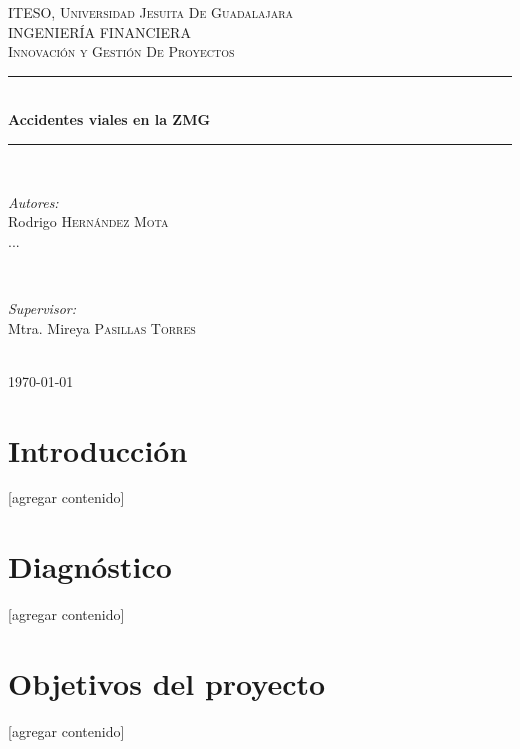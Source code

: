 \documentclass{article}
\begin{document}
\begin{titlepage}
\newcommand{\HRule}{\rule{\linewidth}{0.5mm}}

\center
\textsc{\LARGE ITESO, Universidad Jesuita De Guadalajara}\\[2cm]
\textsc{\Large INGENIERÍA FINANCIERA}\\[1cm]
\textsc{\large Innovación y Gestión De Proyectos}\\[1cm]
\HRule \\[2cm]
{ \huge \bfseries Accidentes viales en la ZMG}\\[2cm] 
\HRule \\[2cm]
\begin{minipage}{0.4\textwidth}
\begin{flushleft} \large


\emph{Autores:}\\
Rodrigo \textsc{Hernández Mota}\\
...
\end{flushleft}
\end{minipage}
~
\begin{minipage}{0.4\textwidth}
\begin{flushright} \large
\emph{Supervisor:} \\
Mtra. Mireya \textsc{Pasillas Torres}
\end{flushright}
\end{minipage}\\[2cm]

{\large \today}\\[1cm]

\vfill
 
\end{titlepage}
\tableofcontents
\newpage

\section{Introducción} %
[agregar contenido]

\section{Diagnóstico} %
[agregar contenido]

\section{Objetivos del proyecto} %
[agregar contenido]
\end{document}
